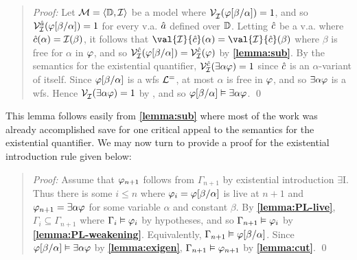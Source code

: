 \begin{quote} 
  \textit{Proof:} Let $\mathcal{M}=\langle\mathbb{D},\mathcal{I}\rangle$ be a model where $\mathcal{V}_{\mathcal{I}}^{}(\varphi[\beta/\alpha])=1$, and so $\mathcal{V}_{\mathcal{I}}^{\hat{a}}(\varphi[\beta/\alpha])=1$ for every v.a. $\hat{a}$ defined over $\mathbb{D}$.
  Letting $\hat{c}$ be a v.a. where $\hat{c}(\alpha)=\mathcal{I}(\beta)$, it follows that $\val{\I}{\va{c}}(\alpha)=\val{\I}{\va{c}}(\beta)$ where $\beta$ is free for $\alpha$ in $\varphi$, and so $\mathcal{V}_{\mathcal{I}}^{\hat{c}}(\varphi[\beta/\alpha])=\mathcal{V}_{\mathcal{I}}^{\hat{c}}(\varphi)$ by \textbf{\ref{lemma:sub}}.
  By the semantics for the existential quantifier, $\mathcal{V}_{\mathcal{I}}^{\hat{c}}(\exists \alpha\varphi)=1$ since $\hat{c}$ is an $\alpha$-variant of itself.
  Since $\varphi[\beta/\alpha]$ is a wfs $\mathcal{L}^{=}$, at most $\alpha$ is free in $\varphi$, and so $\exists \alpha\varphi$ is a wfs. 
  Hence $\mathcal{V}_{\mathcal{I}}^{}(\exists \alpha\varphi)=1$ by , and so $\varphi[\beta/\alpha] \vDash \exists\alpha\varphi$.
  \qed
\end{quote}

This lemma follows easily from \textbf{\ref{lemma:sub}} where most of the work was already accomplished save for one critical appeal to the semantics for the existential quantifier.
We may now turn to provide a proof for the existential introduction rule given below:




\begin{quote} 
  \textit{Proof:} Assume that $\varphi_{n+1}$ follows from $\Gamma_{n+1}$ by existential introduction $\exists$I.
  Thus there is some $i\leq n$ where $\varphi_i=\varphi[\beta/\alpha]$ is live at $n+1$ and $\varphi_{n+1}=\exists \alpha\varphi$ for some variable $\alpha$ and constant $\beta$.
  By \textbf{\ref{lemma:PL-live}}, $\Gamma_i\subseteq \Gamma_{n+1}$ where $\Gamma_i\vDash\varphi_i$ by hypotheses, and so $\Gamma_{n+1} \vDash \varphi_i$ by \textbf{\ref{lemma:PL-weakening}}.
  Equivalently, $\Gamma_{n+1} \vDash \varphi[\beta/\alpha]$.
  Since $\varphi[\beta/\alpha] \vDash \exists \alpha\varphi$ by \textbf{\ref{lemma:exigen}}, $\Gamma_{n+1}\vDash\varphi_{n+1}$ by \textbf{\ref{lemma:cut}}.
  \qed
\end{quote}

